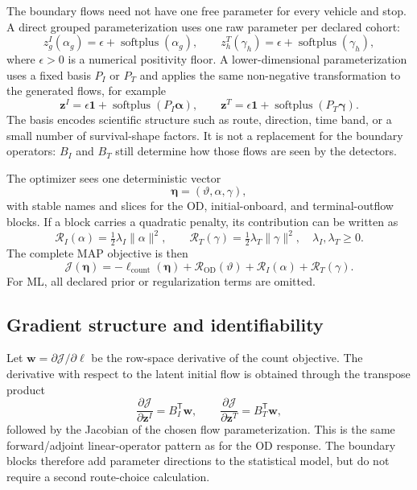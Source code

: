 The boundary flows need not have one free parameter for every vehicle and
stop.  A direct grouped parameterization uses one raw parameter per declared
cohort:
\begin{equation}
 z^{I}_g(\alpha_g)=\epsilon+\operatorname{softplus}(\alpha_g),
 \qquad
 z^{T}_h(\gamma_h)=\epsilon+\operatorname{softplus}(\gamma_h),
 \label{eq:boundary-direct-positive-flow}
\end{equation}
where $\epsilon>0$ is a numerical positivity floor.  A lower-dimensional
parameterization uses a fixed basis $P_I$ or $P_T$ and applies the same
non-negative transformation to the generated flows, for example
\[
 \bm z^{I}=\epsilon\bm 1+\operatorname{softplus}(P_I\bm\alpha),
 \qquad
 \bm z^{T}=\epsilon\bm 1+\operatorname{softplus}(P_T\bm\gamma).
\]
The basis encodes scientific structure such as route, direction, time band,
or a small number of survival-shape factors.  It is not a replacement for
the boundary operators: $B_I$ and $B_T$ still determine how those flows are
seen by the detectors.

The optimizer sees one deterministic vector
\[
 \bm\eta=(\vartheta,\alpha,\gamma),
\]
with stable names and slices for the OD, initial-onboard, and terminal-outflow
blocks.  If a block carries a quadratic penalty, its contribution can be
written as
\[
 \mathcal R_I(\alpha)=\tfrac12\lambda_I\|\alpha\|^2,
 \qquad
 \mathcal R_T(\gamma)=\tfrac12\lambda_T\|\gamma\|^2,
 \quad \lambda_I,\lambda_T\geq0.
\]
The complete MAP objective is then
\begin{equation}
  \mathcal J(\bm\eta)
   =-\ell_{\mathrm{count}}(\bm\eta)
     +\mathcal R_{\mathrm{OD}}(\vartheta)
     +\mathcal R_I(\alpha)+\mathcal R_T(\gamma).
  \label{eq:boundary-map-objective}
\end{equation}
For ML, all declared prior or regularization terms are omitted.

\subsection{Gradient structure and identifiability}

Let $\bm w=\partial\mathcal J/\partial\bm\ell$ be the row-space derivative
of the count objective.  The derivative with respect to the latent initial
flow is obtained through the transpose product
\[
 \frac{\partial\mathcal J}{\partial\bm z^{I}}=B_I^{\mathsf T}\bm w,
 \qquad
 \frac{\partial\mathcal J}{\partial\bm z^{T}}=B_T^{\mathsf T}\bm w,
\]
followed by the Jacobian of the chosen flow parameterization.  This is the
same forward/adjoint linear-operator pattern as for the OD response.  The
boundary blocks therefore add parameter directions to the statistical model,
but do not require a second route-choice calculation.

